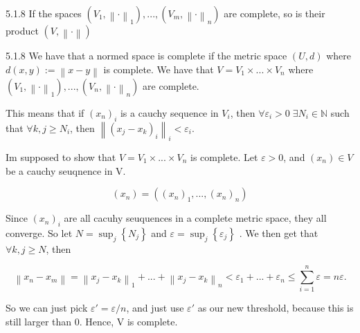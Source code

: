 \documentclass[a4paper,norsk]{article}
\renewcommand{\geq}{\geqslant}
\renewcommand{\leq}{\leqslant}
\renewcommand{\epsilon}{\varepsilon}
\begin{document}
\begin{propositionbox}{5.1.8}{}
If the spaces $ \left( V_1, \left\lVert \cdot \right\rVert _1 \right), ..., \left( V_m, \left\lVert \cdot \right\rVert _n \right)   $ are complete, so is their product $ \left( V, \left\lVert \cdot \right\rVert  \right)  $ 

\begin{proofbox}{5.1.8}{}
  We have that a normed space is complete if the metric space $ \left( U, d \right)  $ where $ d \left( x, y \right) := \left\lVert x - y \right\rVert  $ is complete. We have that $ V = V_1 \times ... \times V_n $ where $ \left( V_1, \left\lVert \cdot \right\rVert _1 \right) , ..., \left( V_n, \left\lVert \cdot \right\rVert _n \right)   $ are complete. 
  
  
  This means that if $ \left( x_n \right)_i  $ is a cauchy sequence in $ V_i $, then   $ \forall \epsilon _i > 0  \; \exists N_i \in \mathbb{N}$ such that $ \forall k, j \geq N_i $, then $ \left\lVert \left( x_j - x_k  \right) _i\right\rVert_i < \epsilon _i  $. 


  Im supposed to show that $ V = V_1 \times ... \times V_n $ is complete. Let $ \epsilon > 0 $, and $ \left( x_n \right)  \in V $ be a cauchy seuqnence in V. 


  \[
      \left( x_n \right) = \left( \left( x_n \right) _1, ..., \left( x_n \right) _n \right) 
  \]

  Since $ \left( x_n \right) _i $ are all cacuhy seuquences in a complete metric space, they all converge. So let $ N = \sup_j \left\{ N_j \right\}  $ and $ \epsilon = \sup_j \left\{ \epsilon _j \right\}  $ . We then get that $ \forall k, j \geq N $, then 
  
  \[
      \left\lVert x_n - x_m \right\rVert = \left\lVert x_j - x_k \right\rVert_1 + ... + \left\lVert x_j - x_k \right\rVert_n < \epsilon_1 + ... + \epsilon _n \leq \sum_{ i=1 }^{ n } \epsilon  = n \epsilon.
  \]
  

  So we can just pick $  \epsilon' = \epsilon / n  $, and just use $ \epsilon ' $ as our new threshold, because this is still larger than 0. Hence, V is complete.
  
\end{proofbox}
\end{propositionbox}
\end{document}

